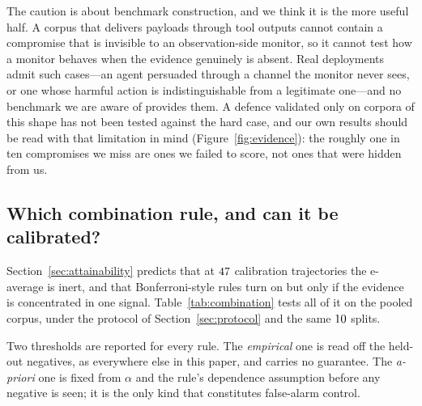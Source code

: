 \documentclass[preprint,12pt,authoryear]{elsarticle}
\theoremstyle{definition}
\begin{document}
The caution is about benchmark construction, and we think it is the more useful
half. A corpus that delivers payloads through tool outputs cannot contain a
compromise that is invisible to an observation-side monitor, so it cannot test how
a monitor behaves when the evidence genuinely is absent. Real deployments admit
such cases---an agent persuaded through a channel the monitor never sees, or one
whose harmful action is indistinguishable from a legitimate one---and no benchmark
we are aware of provides them. A defence validated only on corpora of this shape
has not been tested against the hard case, and our own results should be read with
that limitation in mind (Figure~\ref{fig:evidence}): the roughly one in ten
compromises we miss are ones we failed to score, not ones that were hidden from
us.

\subsection{Which combination rule, and can it be calibrated?}
\label{sec:combination}

Section~\ref{sec:attainability} predicts that at $47$ calibration
trajectories the e-average is inert, and that Bonferroni-style rules turn on but
only if the evidence is concentrated in one signal. Table~\ref{tab:combination}
tests all of it on the pooled corpus, under the protocol of
Section~\ref{sec:protocol} and the same $10$ splits.

Two thresholds are reported for every rule. The \emph{empirical} one is read off
the held-out negatives, as everywhere else in this paper, and carries no
guarantee. The \emph{a-priori} one is fixed from $\alpha$ and the rule's
dependence assumption before any negative is seen; it is the only kind that
constitutes false-alarm control.
\end{document}
